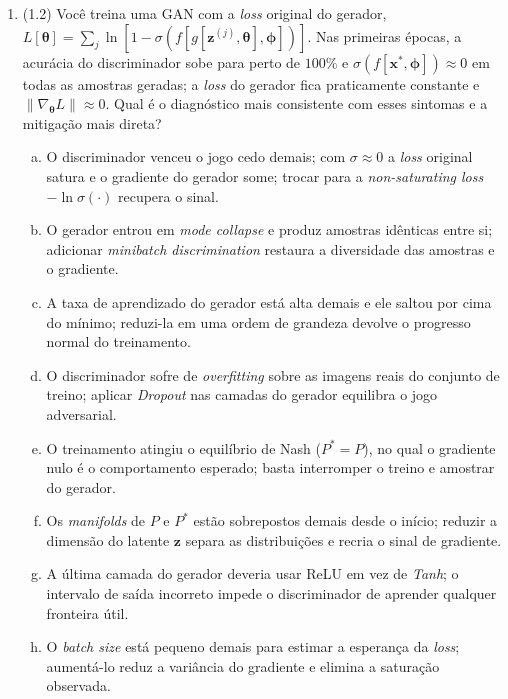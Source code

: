 \documentclass[11pt,a4paper]{article}
\newcommand{\thetav}{\boldsymbol{\theta}}
\begin{document}
\begin{enumerate}[1)]
\begin{enumerate}[a)]
    \item Apenas I está correta.
    \item Apenas II está correta.
    \item Apenas III está correta.
    \item Apenas I e II estão corretas.
    \item Apenas I e III estão corretas.
    \item Apenas II e III estão corretas.
    \item Todas estão corretas.
    \item Nenhuma está correta.
\end{enumerate}

\item (1.2) Você treina uma GAN com a \emph{loss} original do gerador, $L[\thetav] = \sum_{j} \ln\!\left[1 - \sigma\!\left(f\!\left[g[\mathbf{z}^{(j)},\thetav],\boldsymbol{\phi}\right]\right)\right]$. Nas primeiras épocas, a acurácia do discriminador sobe para perto de $100\%$ e $\sigma(f[\mathbf{x}^{*},\boldsymbol{\phi}]) \approx 0$ em todas as amostras geradas; a \emph{loss} do gerador fica praticamente constante e $\|\nabla_{\thetav} L\| \approx 0$. Qual é o diagnóstico mais consistente com esses sintomas e a mitigação mais direta?
\begin{enumerate}[a)]
    \item O discriminador venceu o jogo cedo demais; com $\sigma \approx 0$ a \emph{loss} original satura e o gradiente do gerador some; trocar para a \textit{non-saturating loss} $-\ln \sigma(\cdot)$ recupera o sinal.
    \item O gerador entrou em \textit{mode collapse} e produz amostras idênticas entre si; adicionar \textit{minibatch discrimination} restaura a diversidade das amostras e o gradiente.
    \item A taxa de aprendizado do gerador está alta demais e ele saltou por cima do mínimo; reduzi-la em uma ordem de grandeza devolve o progresso normal do treinamento.
    \item O discriminador sofre de \textit{overfitting} sobre as imagens reais do conjunto de treino; aplicar \textit{Dropout} nas camadas do gerador equilibra o jogo adversarial.
    \item O treinamento atingiu o equilíbrio de Nash ($P^{*} = P$), no qual o gradiente nulo é o comportamento esperado; basta interromper o treino e amostrar do gerador.
    \item Os \textit{manifolds} de $P$ e $P^{*}$ estão sobrepostos demais desde o início; reduzir a dimensão do latente $\mathbf{z}$ separa as distribuições e recria o sinal de gradiente.
    \item A última camada do gerador deveria usar ReLU em vez de \emph{Tanh}; o intervalo de saída incorreto impede o discriminador de aprender qualquer fronteira útil.
    \item O \textit{batch size} está pequeno demais para estimar a esperança da \emph{loss}; aumentá-lo reduz a variância do gradiente e elimina a saturação observada.
\end{enumerate}


\end{enumerate}
\end{document}
